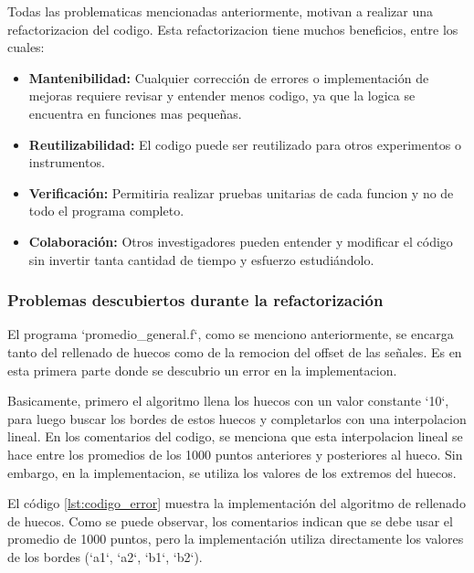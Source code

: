 \documentclass[12pt,a4paper]{article}
\begin{document}
Todas las problematicas mencionadas anteriormente, motivan a realizar una refactorizacion del codigo. Esta refactorizacion tiene muchos beneficios, entre los cuales:

\begin{itemize}

\item \textbf{Mantenibilidad:} Cualquier corrección de errores o implementación de mejoras requiere revisar y entender menos codigo, ya que la logica se encuentra en funciones mas pequeñas.

\item \textbf{Reutilizabilidad:} El codigo puede ser reutilizado para otros experimentos o instrumentos.

\item \textbf{Verificación:} Permitiria realizar pruebas unitarias de cada funcion y no de todo el programa completo.

\item \textbf{Colaboración:} Otros investigadores pueden entender y modificar el código sin
invertir tanta cantidad de tiempo y esfuerzo estudiándolo.

\end{itemize}

\subsubsection{Problemas descubiertos durante la refactorización}

El programa `promedio\_general.f`, como se menciono anteriormente, se encarga tanto del rellenado de huecos como de la remocion del offset de las señales. Es en esta primera parte donde se descubrio un error en la implementacion.

Basicamente, primero el algoritmo llena los huecos con un valor constante `10`, para luego buscar los bordes de estos huecos y completarlos con una interpolacion lineal. En los comentarios del codigo, se menciona que esta interpolacion lineal se hace entre los promedios de los 1000 puntos anteriores y posteriores al hueco. Sin embargo, en la implementacion, se utiliza los valores de los extremos del huecos.

El código \ref{lst:codigo_error} muestra la implementación del algoritmo de rellenado de huecos. Como se puede observar, los comentarios indican que se debe usar el promedio de 1000 puntos, pero la implementación utiliza directamente los valores de los bordes (`a1`, `a2`, `b1`, `b2`).
\end{document}
